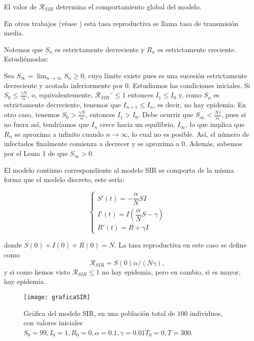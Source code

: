 El valor de $\mathcal{R}_{SIR}$ determina el comportamiento global del modelo.

En otros trabajos (véase \cite{demongeotSIEpidemicModel}) esta tasa reproductiva se llama tasa de transmisión media.

Notemos que $S_n$ es estrictamente decreciente y $R_n$ es estrictamente creciente. Estudiémoslas:

Sea $S_\infty=\lim_{n\rightarrow\infty} S_n\geq 0$, cuyo límite existe pues es una sucesión estrictamente decreciente y acotada inferiormente por $0$. Estudiamos las condiciones iniciales. Si $S_0\leq \frac{\gamma N}{\alpha}$, o, equivalentemente, $\mathcal{R}_{SIR}˘\leq 1$ entonces $I_1\leq I_0$ y, como $S_n$ es estrictamente decreciente, tenemos que $I_{n+1}\leq I_n$, es decir, no hay epidemia. En otro caso, tenemos $S_0> \frac{\gamma N}{\alpha}$, entonces $I_1>I_0$. Debe ocurrir que $S_\infty <\frac{N\gamma}{\alpha}$, pues si no fuera así, tendríamos que $I_n$ crece hacia un equilibrio, $I_\infty$, lo que implica que $R_n$ se aproxima a infinito cuando $n\rightarrow\infty$, lo cual no es posible. Así, el número de infectados finalmente comienza a decrecer y se aproxima a $0$. Además, sabemos por el Lema 1 de \cite{allenDiscretetimeSISIR1994} que $S_\infty>0$.

El modelo continuo correspondiente al modelo SIR se comporta de la misma forma que el modelo discreto, este sería:

\begin{equation}
\label{eqn: modelo_SIR_continuo}
\begin{cases}
S'(t) = -\dfrac{\alpha}{N}SI \\
I'(t) = I\left(\dfrac{\alpha}{N}S-\gamma \right) \\
R'(t) = R+\gamma I
\end{cases}
\end{equation}

donde $S(0)+I(0)+R(0)=N$. La tasa reproductiva en este caso se define como
$$\mathcal{R}_{SIR}=S(0)\alpha /(N\gamma ),$$
y si como hemos visto $\mathcal{R}_{SIR}\leq 1$  no hay epidemia, pero en cambio, si es mayor, hay epidemia.

\begin{figure}
\begin{center}
\caption{Gráfica del modelo SIR, en una población total de $100$ individuos, con valores iniciales $S_0=99, I_0 = 1, R_0 = 0, \alpha = 0.1, \gamma = 0.01 T_0 = 0, T = 300$.}
\texttt{[image: graficaSIR]}
\end{center}
\end{figure}


